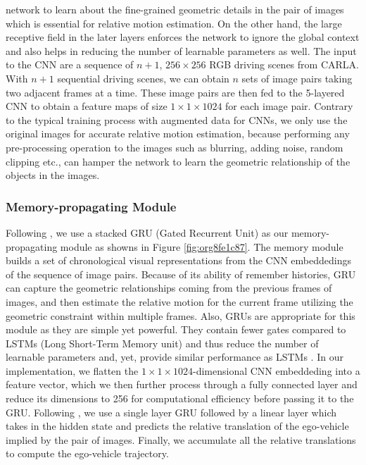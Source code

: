 \documentclass[12pt, letterpaper,cleardoubleempty,BCOR1cm]{scrbook}
\begin{document}
network to learn about the fine-grained geometric details in the pair of images
which is essential for relative motion estimation. On the other hand, the large
receptive field in the later layers enforces the network to ignore the global
context and also helps in reducing the number of learnable parameters as
well. The input to the CNN are a sequence of \(n+1\), \(256 \times 256\) RGB driving
scenes from CARLA. With \(n+1\) sequential driving scenes, we can obtain \(n\)
sets of image pairs taking two adjacent frames at a time. These image pairs are
then fed to the 5-layered CNN to obtain a feature maps of size \(1 \times 1 \times
1024\) for each image pair. Contrary to the typical training process with
augmented data for CNNs, we only use the original images for accurate relative
motion estimation, because performing any pre-processing operation to the images
such as blurring, adding noise, random clipping etc., can hamper the network to
learn the geometric relationship of the objects in the images.

\subsubsection{Memory-propagating Module}
\label{sec:orgf661ae4}
Following \cite{Zhai2019}, we use a stacked GRU (Gated Recurrent Unit)
\cite{Ballas2015} as our memory-propagating module as showns in Figure \ref{fig:org8fe1c87}. The
memory module builds a set of chronological visual representations from the CNN
embeddedings of the sequence of image pairs. Because of its ability of remember
histories, GRU can capture the geometric relationships coming from the previous
frames of images, and then estimate the relative motion for the current frame
utilizing the geometric constraint within multiple frames. Also, GRUs are
appropriate for this module as they are simple yet powerful. They contain fewer
gates compared to LSTMs (Long Short-Term Memory unit) and thus reduce the number
of learnable parameters and, yet, provide similar performance as LSTMs
\cite{Chung2014}. In our implementation, we flatten the \(1 \times 1 \times
1024\)-dimensional CNN embeddeding into a feature vector, which we then further
process through a fully connected layer and reduce its dimensions to 256 for
computational efficiency before passing it to the GRU. Following
\cite{Filos2020}, we use a single layer GRU followed by a linear layer which
takes in the hidden state and predicts the relative translation of the
ego-vehicle implied by the pair of images. Finally, we accumulate all the
relative translations to compute the ego-vehicle trajectory.
\end{document}
